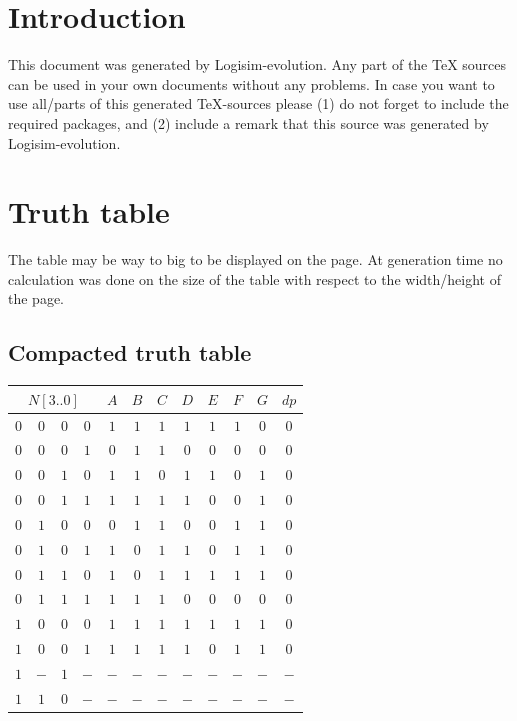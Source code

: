 \documentclass [15pt,a4paper,twoside]{article}
\begin{document}
\section{Introduction}
This document was generated by Logisim-evolution. Any part of the TeX sources can be used in your own documents without any problems. In case you want to use all/parts of this generated TeX-sources please (1) do not forget to include the required packages, and (2) include a remark that this source was generated by Logisim-evolution.
\section{Truth table}
The table may be way to big to be displayed on the page. At generation time no calculation was done on the size of the table with respect to the width/height of the page.
\subsection{Compacted truth table}
\begin{center}
\begin{tabular}{cccc|cccccccc}
\multicolumn{4}{c|}{$N[3..0]$}&$A$&$B$&$C$&$D$&$E$&$F$&$G$&$dp$\\
\hline
$0$&$0$&$0$&$0$&$1$&$1$&$1$&$1$&$1$&$1$&$0$&$0$\\
$0$&$0$&$0$&$1$&$0$&$1$&$1$&$0$&$0$&$0$&$0$&$0$\\
$0$&$0$&$1$&$0$&$1$&$1$&$0$&$1$&$1$&$0$&$1$&$0$\\
$0$&$0$&$1$&$1$&$1$&$1$&$1$&$1$&$0$&$0$&$1$&$0$\\
$0$&$1$&$0$&$0$&$0$&$1$&$1$&$0$&$0$&$1$&$1$&$0$\\
$0$&$1$&$0$&$1$&$1$&$0$&$1$&$1$&$0$&$1$&$1$&$0$\\
$0$&$1$&$1$&$0$&$1$&$0$&$1$&$1$&$1$&$1$&$1$&$0$\\
$0$&$1$&$1$&$1$&$1$&$1$&$1$&$0$&$0$&$0$&$0$&$0$\\
$1$&$0$&$0$&$0$&$1$&$1$&$1$&$1$&$1$&$1$&$1$&$0$\\
$1$&$0$&$0$&$1$&$1$&$1$&$1$&$1$&$0$&$1$&$1$&$0$\\
$1$&$-$&$1$&$-$&$-$&$-$&$-$&$-$&$-$&$-$&$-$&$-$\\
$1$&$1$&$0$&$-$&$-$&$-$&$-$&$-$&$-$&$-$&$-$&$-$\\

\end{tabular}
\end{center}
\end{document}
